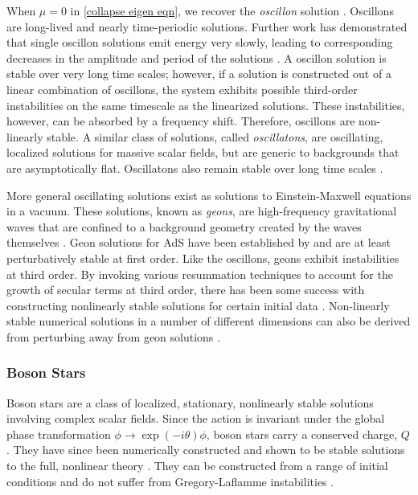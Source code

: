 \documentclass[../PhD.tex]{subfiles}
\begin{document}
When $\mu = 0$ in \eqref{collapse eigen eqn}, we recover the \emph{oscillon} solution \cite{1701.09100}. Oscillons are long-lived and nearly time-periodic solutions. Further work has demonstrated that single oscillon solutions emit energy very slowly, leading to corresponding decreases in the amplitude and period of the solutions \cite{hep-ph/9503217}. A oscillon solution is stable over very long time scales; however, if a solution is constructed out of a linear combination of oscillons, the system exhibits possible third-order instabilities on the same timescale as the linearized solutions. These instabilities, however, can be absorbed by a frequency shift. Therefore, oscillons are non-linearly stable. A similar class of solutions, called \emph{oscillatons}, are oscillating, localized solutions for massive scalar fields, but are generic to backgrounds that are asymptotically flat. Oscillatons also remain stable over long time scales \cite{gr-qc/0310006}.

More general oscillating solutions exist as solutions to Einstein-Maxwell equations in a vacuum. These solutions, known as \emph{geons}, are high-frequency gravitational waves that are confined to a background geometry created by the waves themselves \cite{Wheeler:1955zz}. Geon solutions for AdS have been established by \cite{1109.1825} and are at least perturbatively stable at first order. Like the oscillons, geons exhibit instabilities at third order. By invoking various resummation techniques to account for the growth of secular terms at third order, there has been some success with constructing nonlinearly stable solutions for certain initial data \cite{1408.5906, 1701.07804}. Non-linearly stable numerical solutions in a number of different dimensions can also be derived from perturbing away from geon solutions \cite{1503.07746}.

\subsubsection{Boson Stars}

Boson stars are a class of localized, stationary, nonlinearly stable solutions involving complex scalar fields. Since the \ads action is invariant under the global phase transformation $\phi \to \exp(-i \theta) \phi$, boson stars carry a conserved charge, $Q$. They have since been numerically constructed and shown to be stable solutions to the full, nonlinear theory \cite{1304.4166}. They can be constructed from a range of initial conditions \cite{1209.2378, 1301.2452} and do not suffer from Gregory-Laflamme instabilities \cite{1509.00774}. 
\end{document}
